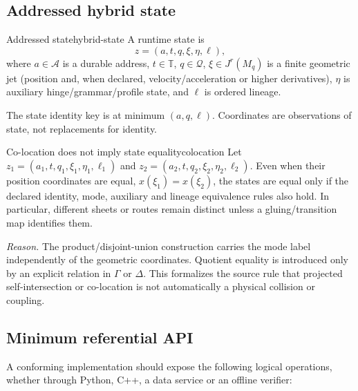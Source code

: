 \documentclass[10pt,a4paper]{article}
\newcommand{\Time}{\mathbb{T}}
\begin{document}
\subsection{Addressed hybrid state}

\begin{formaldef}{Addressed state}{hybrid-state}
A runtime state is
\[
z=(a,t,q,\xi,\eta,\ell),
\]
where \(a\in\mathcal A\) is a durable address, \(t\in\Time\), \(q\in\mathcal Q\), \(\xi\in J^r(M_q)\) is a finite geometric jet (position and, when declared, velocity/acceleration or higher derivatives), \(\eta\) is auxiliary hinge/grammar/profile state, and \(\ell\) is ordered lineage.
\end{formaldef}

The state identity key is at minimum \((a,q,\ell)\). Coordinates are observations of state, not replacements for identity.

\begin{proposition}{Co-location does not imply state equality}{colocation}
Let \(z_1=(a_1,t,q_1,\xi_1,\eta_1,\ell_1)\) and \(z_2=(a_2,t,q_2,\xi_2,\eta_2,\ell_2)\). Even when their position coordinates are equal, \(x(\xi_1)=x(\xi_2)\), the states are equal only if the declared identity, mode, auxiliary and lineage equivalence rules also hold. In particular, different sheets or routes remain distinct unless a gluing/transition map identifies them.
\end{proposition}

\textit{Reason.} The product/disjoint-union construction carries the mode label independently of the geometric coordinates. Quotient equality is introduced only by an explicit relation in \(\Gamma\) or \(\Delta\). This formalizes the source rule that projected self-intersection or co-location is not automatically a physical collision or coupling.

\subsection{Minimum referential API}

A conforming implementation should expose the following logical operations, whether through Python, C++, a data service or an offline verifier:
\end{document}
